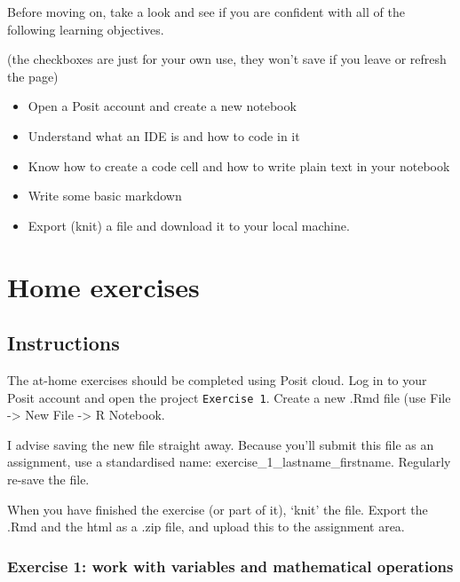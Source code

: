 \documentclass[
  letterpaper,
  DIV=11,
  numbers=noendperiod]{scrreprt}
\begin{document}
Before moving on, take a look and see if you are confident with all of
the following learning objectives.

(the checkboxes are just for your own use, they won't save if you leave
or refresh the page)

\begin{itemize}
\item[$\square$]
  Open a Posit account and create a new notebook
\item[$\square$]
  Understand what an IDE is and how to code in it
\item[$\square$]
  Know how to create a code cell and how to write plain text in your
  notebook
\item[$\square$]
  Write some basic markdown
\item[$\square$]
  Export (knit) a file and download it to your local machine.
\end{itemize}

\section{}\label{section-1}

\chapter{Home exercises}\label{home-exercises}

\section{Instructions}\label{instructions}

The at-home exercises should be completed using Posit cloud. Log in to
your Posit account and open the project \texttt{Exercise\ 1}. Create a
new .Rmd file (use File -\textgreater{} New File -\textgreater{} R
Notebook.

I advise saving the new file straight away. Because you'll submit this
file as an assignment, use a standardised name:
exercise\_1\_lastname\_firstname. Regularly re-save the file.

When you have finished the exercise (or part of it), `knit' the file.
Export the .Rmd and the html as a .zip file, and upload this to the
assignment area.

\subsection{Exercise 1: work with variables and mathematical
operations}\label{exercise-1-work-with-variables-and-mathematical-operations}
\end{document}
